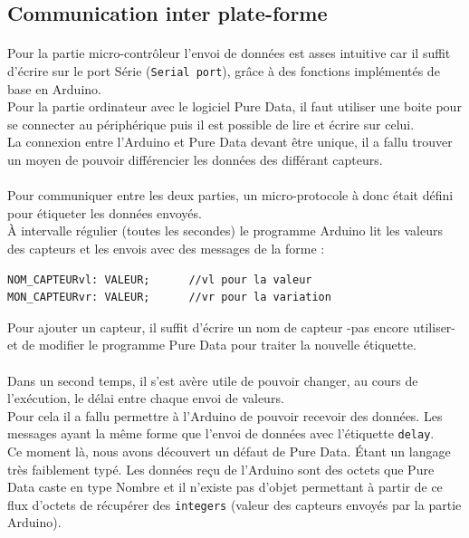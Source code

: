 \documentclass[a4paper, titlepage, oneside, 12pt]{article}%
\begin{document}
\subsection{Communication inter plate-forme}
\paragraph{}
Pour la partie micro-contrôleur l'envoi de données est asses intuitive car il suffit d’écrire sur le port Série (\texttt{Serial port}), grâce à des fonctions implémentés de base en Arduino.\\
Pour la partie ordinateur avec le logiciel Pure Data, il faut utiliser une boite pour se connecter au périphérique puis il est possible de lire et écrire sur celui.\\
La connexion entre l'Arduino et Pure Data devant être unique, il a fallu trouver un moyen de pouvoir différencier les données des différant capteurs. 

\paragraph{}
Pour communiquer entre les deux parties, un micro-protocole à donc était défini pour étiqueter les données envoyés.\\
À intervalle régulier (toutes les secondes) le programme Arduino lit les valeurs des capteurs et les envois avec des messages de la forme :
\begin{lstlisting}
NOM_CAPTEURvl: VALEUR;		//vl pour la valeur
MON_CAPTEURvr: VALEUR;		//vr pour la variation
\end{lstlisting}

Pour ajouter un capteur, il suffit d'écrire un nom de capteur -pas encore utiliser- et de modifier le programme Pure Data pour traiter la nouvelle étiquette.

\paragraph{}
Dans un second temps, il s'est avère utile de pouvoir changer, au cours de l’exécution, le délai entre chaque envoi de valeurs. \\
Pour cela il a fallu permettre à l'Arduino de pouvoir recevoir des données. Les messages ayant la même forme que l'envoi de données avec l'étiquette \texttt{delay}.\\
Ce moment là, nous avons découvert un défaut de Pure Data. Étant un langage très faiblement typé. Les données reçu de l'Arduino sont des octets que Pure Data caste en type Nombre et il n'existe pas d'objet permettant à partir de ce flux d'octets de récupérer des \texttt{integers} (valeur des capteurs envoyés par la partie Arduino).\\
\end{document}
